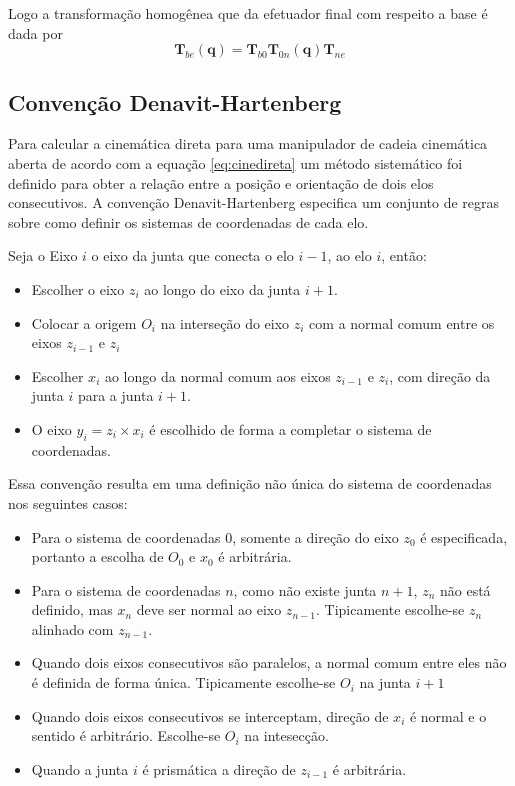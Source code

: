 Logo a transformação homogênea que da efetuador final com respeito a base é dada por
\begin{equation}
\bm{T}_{be}(\bm{q}) = \bm{T}_{b0} \bm{T}_{0n}(\bm{q}) \bm{T}_{ne} 
\end{equation}

\subsection{Convenção Denavit-Hartenberg}
Para calcular a cinemática direta para uma manipulador de cadeia cinemática aberta de acordo com a equação \eqref{eq:cinedireta} um método sistemático foi definido para obter a relação entre a posição e orientação de dois elos consecutivos. A convenção Denavit-Hartenberg especifica um conjunto de regras sobre como definir os sistemas de coordenadas de cada elo.

Seja o Eixo $i$ o eixo da junta que conecta o elo $i-1$, ao elo $i$, então:

\begin{itemize}
\item Escolher o eixo $z_i$ ao longo do eixo da junta $i+1$.
\item Colocar a origem $O_i$ na interseção do eixo $z_i$ com a normal comum entre os eixos $z_{i-1}$ e $z_i$
\item Escolher $x_i$ ao longo da normal comum aos eixos $z_{i-1}$ e $z_i$, com direção da junta $i$ para a junta $i+1$. 
\item O eixo $y_i = z_i \times x_i$ é escolhido de forma a completar o sistema de coordenadas.
\end{itemize}

Essa convenção resulta em uma definição não única do sistema de coordenadas nos seguintes casos:

\begin{itemize}
\item Para o sistema de coordenadas $0$, somente a direção do eixo $z_0$ é especificada, portanto a escolha de $O_0$ e $ x_0$ é arbitrária.
\item Para o sistema de coordenadas $n$, como não existe junta $n+1$, $z_n$ não está definido, mas $x_n$ deve ser normal ao eixo $z_{n-1}$. Tipicamente escolhe-se $z_n$ alinhado com $z_{n-1}$.
\item Quando dois eixos consecutivos são paralelos, a normal comum entre eles não é definida de forma única. Tipicamente escolhe-se $O_i$ na junta $i+1$
\item  Quando dois eixos consecutivos se interceptam, direção de $x_i$ é normal e o sentido é arbitrário. Escolhe-se $O_i$ na intesecção.
\item Quando a junta $i$ é prismática a direção de $z_{i-1}$ é arbitrária.
\end{itemize}

